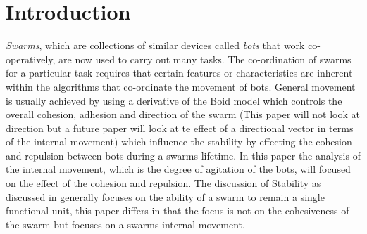 \documentclass[10pt,journal,letterpaper,twoside]{IEEEtran}
\newcommand{\stability}{internal movement}
\begin{document}
\maketitle


\IEEEdisplaynotcompsoctitleabstractindextext


%
\IEEEpeerreviewmaketitle

\section{Introduction\label{section:introduction}}

\emph{Swarms}, which are collections of similar devices called \emph{bots} that work co-operatively, are now used to carry out many tasks. The co-ordination of swarms for a particular task requires that certain features or characteristics are inherent within the algorithms that co-ordinate the movement of bots. General movement is usually achieved by using a derivative of the Boid model \cite{CR87} which controls the overall cohesion, adhesion and direction of the swarm (This paper will not look at direction but a future paper will look at te effect of a directional vector in terms of the \stability{}) which influence the stability by effecting the cohesion and repulsion between bots during a swarms lifetime. In this paper the analysis of the \stability{}, which is the degree of agitation of the bots, will focused on the effect of the cohesion and repulsion.
The discussion of Stability as discussed in \cite{VGKP02} \cite{XCFPLLHF06} generally focuses on the ability of a swarm to remain a single functional unit, this paper differs in that the focus is not on the cohesiveness of the swarm but focuses on a swarms \stability{}.
\end{document}
